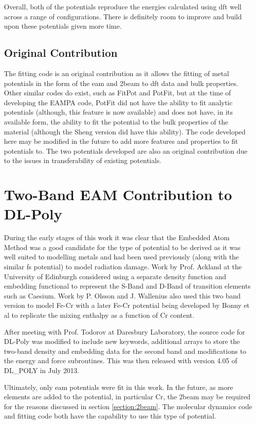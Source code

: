 Overall, both of the potentials reproduce the energies calculated using \acrshort{dft} well across a range of configurations.  There is definitely room to improve and build upon these potentials given more time.

\subsection{Original Contribution}

The fitting code is an original contribution as it allows the fitting of metal potentials in the form of the \acrlong{eam} and \acrlong{2beam} to \acrshort{dft} data and bulk properties.  Other similar codes do exist, such as FitPot and PotFit, but at the time of developing the EAMPA code, PotFit did not have the ability to fit analytic potentials (although, this feature is now available) and does not have, in its available form, the ability to fit the potential to the bulk properties of the material (although the Sheng version did have this ability).  The code developed here may be modified in the future to add more features and properties to fit potentials to.  The two potentials developed are also an original contribution due to the issues in transferability of existing potentials. 



\section{Two-Band EAM Contribution to DL-Poly}

During the early stages of this work it was clear that the Embedded Atom Method was a good candidate for the type of potential to be derived as it was well suited to modelling metals and had been used previously (along with the similar \acrshort{fs} potential) to model radiation damage\cite{damagebcciron}.  Work by Prof. Ackland at the University of Edinburgh considered using a separate density function and embedding functional to represent the S-Band and D-Band of transition elements such as Caesium.  Work by P. Olsson and J. Wallenius also used this two band version to model Fe-Cr with a later Fe-Cr potential being developed by Bonny et al to replicate the mixing enthalpy as a function of Cr content.  

After meeting with Prof. Todorov at Daresbury Laboratory, the source code for DL-Poly was modified to include new keywords, additional arrays to store the two-band density and embedding data for the second band and modifications to the energy and force subroutines.  This was then released with version 4.05 of DL\_POLY in July 2013.  

Ultimately, only \acrshort{eam} potentials were fit in this work.  In the future, as more elements are added to the potential, in particular Cr, the \acrshort{2beam} may be required for the reasons discussed in section \ref{section:2beam}.  The molecular dynamics code and fitting code both have the capability to use this type of potential.







